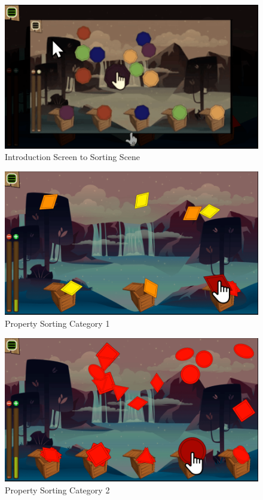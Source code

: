\begin{figure}[H]
    \centering
    \includegraphics[width=1\textwidth]{figures/introduction}
    \caption{Introduction Screen to Sorting Scene}
    \label{fig:introduction}
\end{figure}

\begin{figure}[H]
    \centering
    \includegraphics[width=1\textwidth]{figures/property1}
    \caption{Property Sorting Category 1}
    \label{fig:property1}
\end{figure}

\begin{figure}[H]
    \centering
    \includegraphics[width=1\textwidth]{figures/property2}
    \caption{Property Sorting Category 2}
    \label{fig:property2}
\end{figure}


